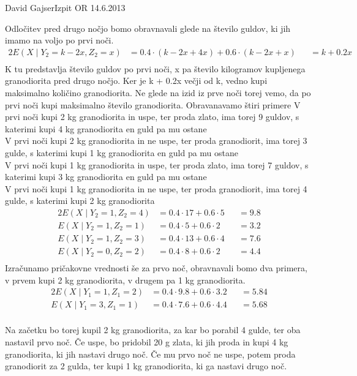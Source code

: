 \begin{naloga}{David Gajser}{Izpit OR 14.6.2013}
\begin{odgovor}
Odločitev pred drugo nočjo bomo obravnavali glede na število guldov, ki jih imamo na voljo po prvi noči.
\begin{alignat*}{2}
E(X \mid  Y_2 = k-2x, Z_2 = x) &= 0.4 \cdot (k - 2x + 4x) + 0.6 \cdot (k - 2x + x) &&= k + 0.2x \\
\end{alignat*}
K tu predstavlja število guldov po prvi noči, x pa število kilogramov kupljenega granodiorita pred drugo nočjo. Ker je k + 0.2x večji od k, vedno kupi maksimalno količino granodiorita.
Ne glede na izid iz prve noči torej vemo, da po prvi noči kupi maksimalno število granodiorita.
Obravanavamo štiri primere 
V prvi noči kupi 2 kg granodiorita in uspe, ter proda zlato, ima torej 9 guldov, s katerimi kupi 4 kg granodiorita en guld pa mu ostane\\
V prvi noči kupi 2 kg granodiorita in ne uspe, ter proda granodiorit, ima torej 3 gulde, s katerimi kupi 1 kg granodiorita en guld pa mu ostane\\
V prvi noči kupi 1 kg granodiorita in uspe, ter proda zlato, ima torej 7 guldov, s katerimi kupi 3 kg granodiorita en guld pa mu ostane\\
V prvi noči kupi 1 kg granodiorita in ne uspe, ter proda granodiorit, ima torej 4 gulde, s katerimi kupi 2 kg granodiorita\\

\begin{alignat*}{2}
E(X \mid  Y_2 = 1, Z_2 = 4) &= 0.4 \cdot 17 + 0.6 \cdot 5 &&= 9.8 \\
E(X \mid  Y_2 = 1, Z_2 = 1) &= 0.4 \cdot 5 + 0.6 \cdot 2 &&= 3.2 \\
E(X \mid  Y_2 = 1, Z_2 = 3) &= 0.4 \cdot 13 + 0.6 \cdot 4 &&= 7.6 \\
E(X \mid  Y_2 = 0, Z_2 = 2) &= 0.4 \cdot 8 + 0.6 \cdot 2 &&= 4.4 \\
\end{alignat*}
Izračunamo pričakovne vrednosti še za prvo noč, obravnavali bomo dva primera, v prvem kupi 2 kg granodiorita, v drugem pa 1 kg granodiorita.
\begin{alignat*}{2}
E(X \mid  Y_1 = 1, Z_1 = 2) &= 0.4 \cdot 9.8 + 0.6 \cdot 3.2 &&= 5.84 \\
E(X \mid  Y_1 = 3, Z_1 = 1) &= 0.4 \cdot 7.6 + 0.6 \cdot 4.4 &&= 5.68 \\
\end{alignat*}

Na začetku bo torej kupil 2 kg granodiorita, za kar bo porabil 4 gulde, ter oba nastavil prvo noč. Če uspe, bo pridobil 20 g zlata, ki 
jih proda in kupi 4 kg granodiorita, ki jih nastavi drugo noč.
Če mu prvo noč ne uspe, potem proda granodiorit za 2 gulda, ter kupi 1 kg granodiorita, ki ga nastavi drugo noč.

\begin{slika}
\makebox[\textwidth][c]{
\pgfslika
}
\end{slika}
\end{odgovor}
\end{naloga}
